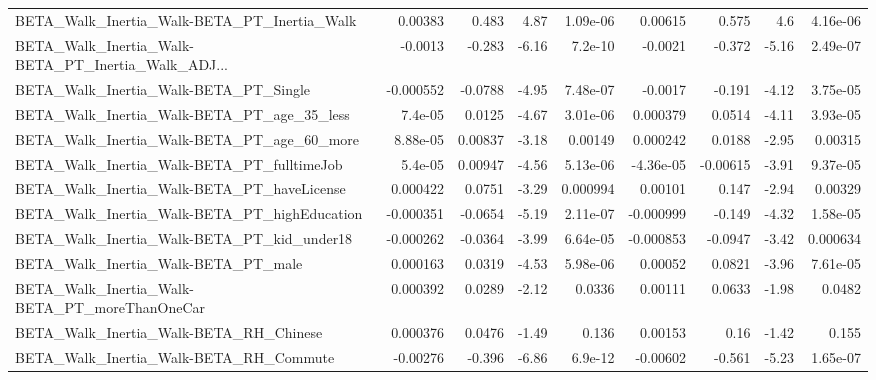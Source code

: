 \begin{tabular}{lrrrrrrrr}
BETA\_Walk\_Inertia\_Walk-BETA\_PT\_Inertia\_Walk        &     0.00383 &        0.483 &     4.87 & 1.09e-06 &    0.00615 &       0.575 &          4.6 &      4.16e-06 \\
BETA\_Walk\_Inertia\_Walk-BETA\_PT\_Inertia\_Walk\_ADJ... &     -0.0013 &       -0.283 &    -6.16 &  7.2e-10 &    -0.0021 &      -0.372 &        -5.16 &      2.49e-07 \\
BETA\_Walk\_Inertia\_Walk-BETA\_PT\_Single              &   -0.000552 &      -0.0788 &    -4.95 & 7.48e-07 &    -0.0017 &      -0.191 &        -4.12 &      3.75e-05 \\
BETA\_Walk\_Inertia\_Walk-BETA\_PT\_age\_35\_less         &     7.4e-05 &       0.0125 &    -4.67 & 3.01e-06 &   0.000379 &      0.0514 &        -4.11 &      3.93e-05 \\
BETA\_Walk\_Inertia\_Walk-BETA\_PT\_age\_60\_more         &    8.88e-05 &      0.00837 &    -3.18 &  0.00149 &   0.000242 &      0.0188 &        -2.95 &       0.00315 \\
BETA\_Walk\_Inertia\_Walk-BETA\_PT\_fulltimeJob         &     5.4e-05 &      0.00947 &    -4.56 & 5.13e-06 &  -4.36e-05 &    -0.00615 &        -3.91 &      9.37e-05 \\
BETA\_Walk\_Inertia\_Walk-BETA\_PT\_haveLicense         &    0.000422 &       0.0751 &    -3.29 & 0.000994 &    0.00101 &       0.147 &        -2.94 &       0.00329 \\
BETA\_Walk\_Inertia\_Walk-BETA\_PT\_highEducation       &   -0.000351 &      -0.0654 &    -5.19 & 2.11e-07 &  -0.000999 &      -0.149 &        -4.32 &      1.58e-05 \\
BETA\_Walk\_Inertia\_Walk-BETA\_PT\_kid\_under18         &   -0.000262 &      -0.0364 &    -3.99 & 6.64e-05 &  -0.000853 &     -0.0947 &        -3.42 &      0.000634 \\
BETA\_Walk\_Inertia\_Walk-BETA\_PT\_male                &    0.000163 &       0.0319 &    -4.53 & 5.98e-06 &    0.00052 &      0.0821 &        -3.96 &      7.61e-05 \\
BETA\_Walk\_Inertia\_Walk-BETA\_PT\_moreThanOneCar      &    0.000392 &       0.0289 &    -2.12 &   0.0336 &    0.00111 &      0.0633 &        -1.98 &        0.0482 \\
BETA\_Walk\_Inertia\_Walk-BETA\_RH\_Chinese             &    0.000376 &       0.0476 &    -1.49 &    0.136 &    0.00153 &        0.16 &        -1.42 &         0.155 \\
BETA\_Walk\_Inertia\_Walk-BETA\_RH\_Commute             &    -0.00276 &       -0.396 &    -6.86 &  6.9e-12 &   -0.00602 &      -0.561 &        -5.23 &      1.65e-07 \\

\end{tabular}
